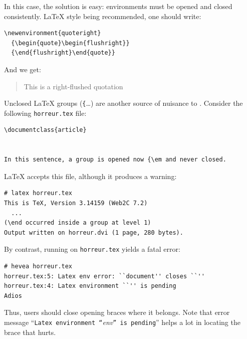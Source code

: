 In this case, the solution is easy: environments must be opened and
closed consistently. \LaTeX{} style being recommended, one should write:
\begin{verbatim}
\newenvironment{quoteright}
  {\begin{quote}\begin{flushright}}
  {\end{flushright}\end{quote}}
\end{verbatim}
And we get:
\begin{htmlout}\newenvironment{quoteright}{\begin{quote}\begin{flushright}}{\end{flushright}\end{quote}}
\begin{htmlonly}
\begin{quoteright}
This is a right-flushed quotation
\end{quoteright}
\end{htmlonly}
\end{htmlout}


Unclosed \LaTeX{} groups (\verb+{+\ldots{}) are another source
of nuisance to \hevea{}.
Consider the following \texttt{horreur.tex} file:
\begin{verbatim}
\documentclass{article}


In this sentence, a group is opened now {\em and never closed.

\end{verbatim}
\LaTeX{} accepts this file, although it produces a warning:
\begin{verbatim}
# latex horreur.tex 
This is TeX, Version 3.14159 (Web2C 7.2)
  ...
(\end occurred inside a group at level 1)
Output written on horreur.dvi (1 page, 280 bytes).

\end{verbatim}

By contrast, running \hevea{} on \texttt{horreur.tex} yields a fatal error:
\begin{verbatim}
# hevea horreur.tex 
horreur.tex:5: Latex env error: ``document'' closes ``''
horreur.tex:4: Latex environment ``'' is pending
Adios
\end{verbatim}
Thus, users should close opening braces where it belongs.
Note that \hevea{} error message ``\texttt{Latex environment
``}\textit{env}\texttt{'' is pending}'' helps a lot in locating
the brace that hurts.

